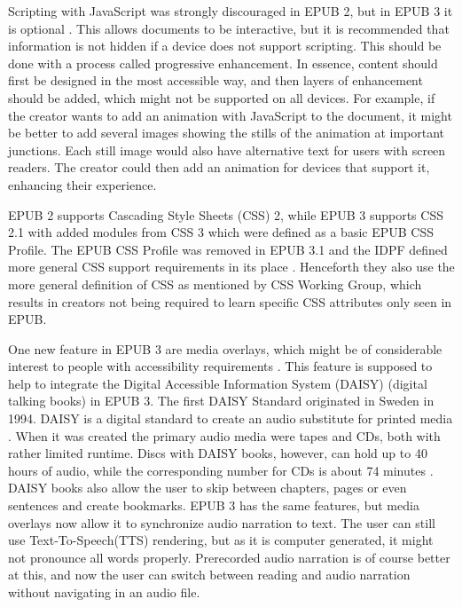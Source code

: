 Scripting with JavaScript was strongly discouraged in EPUB 2, but in EPUB 3 it is optional \cite{EPUB3bp}. This allows documents to be interactive, but it is recommended that information is not hidden if a device does not support scripting. This should be done with a process called progressive enhancement. In essence, content should first be designed in the most accessible way, and then layers of enhancement should be added, which might not be supported on all devices. For example, if the creator wants to add an animation with JavaScript to the document, it might be better to add several images showing the stills of the animation at important junctions. Each still image would also have alternative text for users with screen readers. The creator could then add an animation for devices that support it, enhancing their experience.

EPUB 2 supports Cascading Style Sheets (CSS) 2, while EPUB 3 supports CSS 2.1 with added modules from CSS 3 which were defined as a basic EPUB CSS Profile. The EPUB CSS Profile was removed in EPUB 3.1 and the IDPF defined more general CSS support requirements in its place \cite{EPUB31changes}. Henceforth they also use the more general definition of CSS as mentioned by CSS Working Group, which results in creators not being required to learn specific CSS attributes only seen in EPUB.

One new feature in EPUB 3 are media overlays, which might be of considerable interest to people with accessibility requirements \cite{EPUB3bp}. This feature is supposed to help to integrate the Digital Accessible Information System (DAISY) (digital talking books) in EPUB 3. The first DAISY Standard originated in Sweden in 1994. DAISY is a digital standard to create an audio substitute for printed media \cite{daisyAccessibility}. When it was created the primary audio media were tapes and CDs, both with rather limited runtime. Discs with DAISY books, however, can hold up to 40 hours of audio, while the corresponding number for CDs is about 74 minutes \cite{wasIstDaisy}. DAISY books also allow the user to skip between chapters, pages or even sentences and create bookmarks. EPUB 3 has the same features, but media overlays now allow it to synchronize audio narration to text. The user can still use Text-To-Speech(TTS) rendering, but as it is computer generated, it might not pronounce all words properly. Prerecorded audio narration is of course better at this, and now the user can switch between reading and audio narration without navigating in an audio file.

